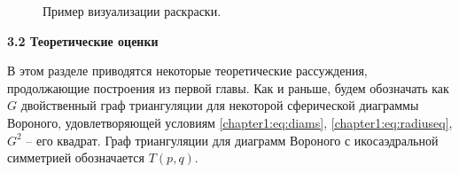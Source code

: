 \FloatBarrier
\begin{figure}[!htbp]
\centering
\captionsetup{justification=centering}
\begin{minipage}[b]{0.5\linewidth}
\vspace{1ex}
\end{minipage}\hfill
\begin{minipage}[b]{0.5\linewidth}
\vspace{1ex}
\end{minipage}\hfill
\begin{minipage}[b]{0.5\linewidth}
\vspace{1ex}
\end{minipage}\hfill
\begin{minipage}[b]{0.5\linewidth}
\vspace{1ex}
\end{minipage}\hfill
\caption{Пример визуализации раскраски.}
\label{chapter3:fig:viz}
\end{figure}

\vspace{5pt}
\textbf{3.2 Теоретические оценки}\label{chapters:3.2}
\vspace{5pt}

В этом разделе приводятся некоторые теоретические рассуждения, продолжающие построения из первой главы. 
Как и раньше, будем обозначать как $G$ двойственный граф триангуляции для некоторой сферической диаграммы Вороного, 
удовлетворяющей условиям \ref{chapter1:eq:diams}, \ref{chapter1:eq:radiuseq}, $G^2$ -- его квадрат. 
Граф триангуляции для диаграмм Вороного с икосаэдральной симметрией обозначается $T(p,q)$.

